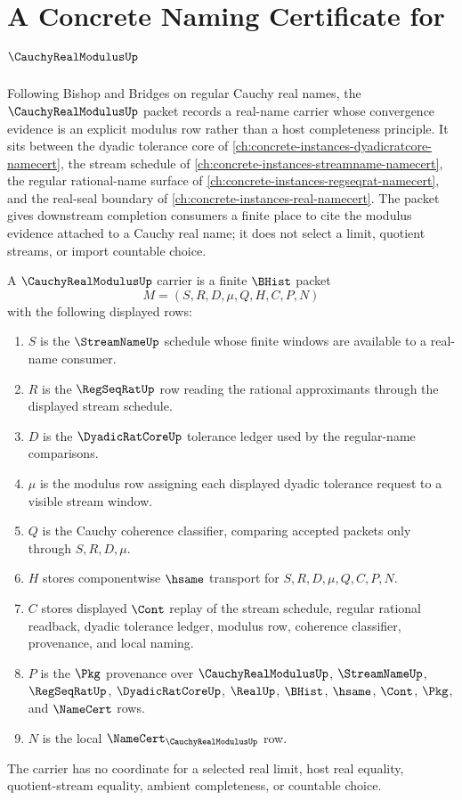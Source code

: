 \chapter{A Concrete Naming Certificate for $\CauchyRealModulusUp$}
\label{ch:concrete-instances-cauchy-real-modulus-namecert}

Following Bishop and Bridges on regular Cauchy real names, the $\CauchyRealModulusUp$ packet records a real-name carrier whose convergence evidence is an explicit modulus row rather than a host completeness principle. It sits between the dyadic tolerance core of \autoref{ch:concrete-instances-dyadicratcore-namecert}, the stream schedule of \autoref{ch:concrete-instances-streamname-namecert}, the regular rational-name surface of \autoref{ch:concrete-instances-regseqrat-namecert}, and the real-seal boundary of \autoref{ch:concrete-instances-real-namecert}. The packet gives downstream completion consumers a finite place to cite the modulus evidence attached to a Cauchy real name; it does not select a limit, quotient streams, or import countable choice.

\begin{definition}
\label{def:cauchy-real-modulus-carrier}
A $\CauchyRealModulusUp$ carrier is a finite $\BHist$ packet
$$
M=(S,R,D,\mu,Q,H,C,P,N)
$$
with the following displayed rows:
\begin{enumerate}
\item $S$ is the $\StreamNameUp$ schedule whose finite windows are available to a real-name consumer.
\item $R$ is the $\RegSeqRatUp$ row reading the rational approximants through the displayed stream schedule.
\item $D$ is the $\DyadicRatCoreUp$ tolerance ledger used by the regular-name comparisons.
\item $\mu$ is the modulus row assigning each displayed dyadic tolerance request to a visible stream window.
\item $Q$ is the Cauchy coherence classifier, comparing accepted packets only through $S,R,D,\mu$.
\item $H$ stores componentwise $\hsame$ transport for $S,R,D,\mu,Q,C,P,N$.
\item $C$ stores displayed $\Cont$ replay of the stream schedule, regular rational readback, dyadic tolerance ledger, modulus row, coherence classifier, provenance, and local naming.
\item $P$ is the $\Pkg$ provenance over $\CauchyRealModulusUp$, $\StreamNameUp$, $\RegSeqRatUp$, $\DyadicRatCoreUp$, $\RealUp$, $\BHist$, $\hsame$, $\Cont$, $\Pkg$, and $\NameCert$ rows.
\item $N$ is the local $\NameCert_{\CauchyRealModulusUp}$ row.
\end{enumerate}
The carrier has no coordinate for a selected real limit, host real equality, quotient-stream equality, ambient completeness, or countable choice.
\end{definition}

